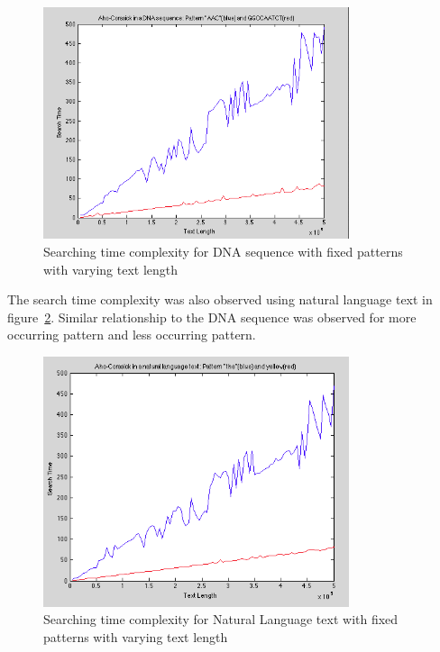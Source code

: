 \documentclass[paper=a4, fontsize=11pt]{scrartcl} %
\numberwithin{equation}{section} %
\numberwithin{figure}{section} %
\numberwithin{table}{section} %
\begin{document}
\begin{figure}[h!]
\centering
\includegraphics[width=0.8\textwidth]{figures/ser-DNA-fixed-pattern.png}
\caption{Searching time complexity for DNA sequence with fixed patterns with varying text length}
\label{fig:ser-dna-pattern}
\end{figure}

The search time complexity was also observed using natural language text in figure~\ref{fig:ser-natural-pattern}. Similar relationship to the DNA sequence was observed for more occurring pattern and less occurring pattern.

\begin{figure}[h!]
\centering
\includegraphics[width=0.8\textwidth]{figures/ser-Natural-fixed-pattern.png}
\caption{Searching time complexity for Natural Language text with fixed patterns with varying text length}
\label{fig:ser-natural-pattern}
\end{figure}

\newpage
\end{document}
